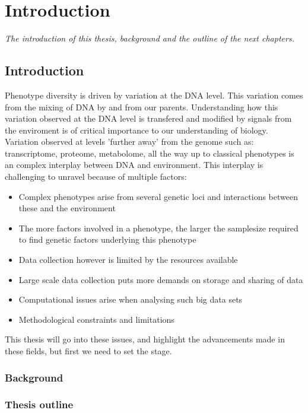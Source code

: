 \chapter{Introduction}
\emph{The introduction of this thesis, background and the outline of the next chapters.}

\null
\vfill
\newpage

\section{Introduction}

Phenotype diversity is driven by variation at the DNA level. This variation comes from the mixing of 
DNA by and from our parents. Understanding how this variation observed at the DNA level is transfered 
and modified by signals from the enviroment is of critical importance to our understanding of 
biology. Variation observed at levels 'further away' from the genome such as: transcriptome, proteome, 
metabolome, all the way up to classical phenotypes is an complex interplay between DNA and 
environment. This interplay is challenging to unravel because of multiple factors:\\
\begin{itemize}
\item Complex phenotypes arise from several genetic loci and interactions between these and the 
environment
\item The more factors involved in a phenotype, the larger the samplesize required to find genetic 
factors underlying this phenotype
\item Data collection however is limited by the resources available
\item Large scale data collection puts more demands on storage and sharing of data
\item Computational issues arise when analysing such big data sets
\item Methodological constraints and limitations
\end{itemize}

This thesis will go into these issues, and highlight the advancements made in these 
fields, but first we need to set the stage.

\subsection{Background}


\subsection{Thesis outline}


